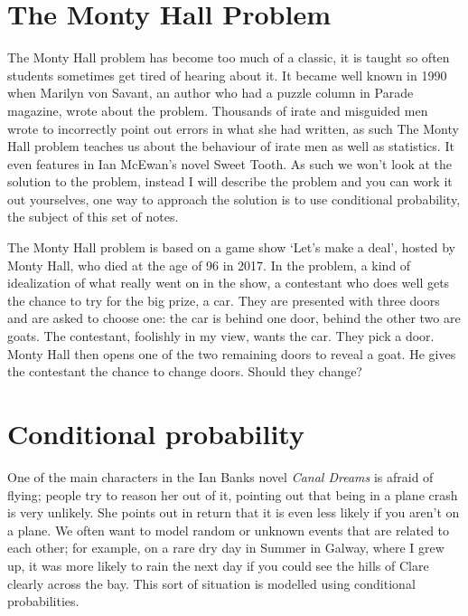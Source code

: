 \documentclass[11pt,a4paper]{scrartcl}
\begin{document}
\section*{The Monty Hall Problem}

The Monty Hall problem has become too much of a classic, it is taught
so often students sometimes get tired of hearing about it. It became
well known in 1990 when Marilyn von Savant, an author who had a puzzle
column in Parade magazine, wrote about the problem. Thousands of irate
and misguided men wrote to incorrectly point out errors in what she
had written, as such  The Monty Hall problem teaches us about the
behaviour of irate men as well as statistics. It even features in Ian
McEwan's novel Sweet Tooth. As such we won't look at the solution to
the problem, instead I will describe the problem and you can work it
out yourselves, one way to approach the solution is to use conditional
probability, the subject of this set of notes.

The Monty Hall problem is based on a game show \lq{}Let's make a
deal\rq{}, hosted by Monty Hall, who died at the age of 96 in 2017. In
the problem, a kind of idealization of what really went on in the
show, a contestant who does well gets the chance to try for the big
prize, a car. They are presented with three doors and are asked to
choose one: the car is behind one door, behind the other two are
goats. The contestant, foolishly in my view, wants the car. They pick
a door. Monty Hall then opens one of the two remaining doors to reveal
a goat. He gives the contestant the chance to change doors. Should
they change?

\section*{Conditional probability}

One of the main characters in the Ian Banks novel \textit{Canal
  Dreams} is afraid of flying; people try to reason her out of it,
pointing out that being in a plane crash is very unlikely. She points
out in return that it is even less likely if you aren't on a plane. We
often want to model random or unknown events that are related to each
other; for example, on a rare dry day in Summer in Galway, where I
grew up, it was more likely to rain the next day if you could see the
hills of Clare clearly across the bay. This sort of situation is
modelled using conditional probabilities.
\end{document}
